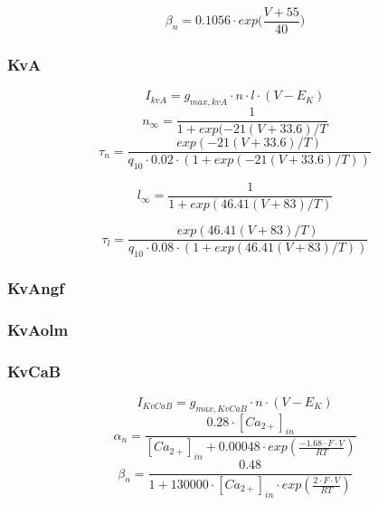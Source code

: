 \documentclass[12pt]{article}
\begin{document}
\begin{equation}
\beta_n = 0.1056 \cdot exp \Big( \frac{V + 55}{40} \Big)
\end{equation}

\subsubsection{KvA}
\begin{equation}
I_{kvA} = g_{max, kvA} \cdot n \cdot l \cdot (V - E_K)
\end{equation}
\begin{equation}
n_{\infty} = \frac{1}{1 + exp(-21(V + 33.6)/T}
\end{equation}
\begin{equation}
\tau_n = \frac{exp(-21(V + 33.6)/T) }
{q_{10} \cdot 0.02 \cdot (1 + exp(-21(V + 33.6)/T))}
\end{equation}

\begin{equation}
l_{\infty} = \frac{1}{1 + exp(46.41(V + 83)/T)}
\end{equation}

\begin{equation}
\tau_l = \frac{exp(46.41(V + 83)/T) }
{q_{10} \cdot 0.08 \cdot (1 + exp(46.41(V + 83)/T))}
\end{equation}

\subsubsection{KvAngf}



\subsubsection{KvAolm}


\subsubsection{KvCaB}
\begin{equation}
I_{KvCaB} = g_{max, KvCaB} \cdot n \cdot (V - E_K)
\end{equation}
\begin{equation}
\alpha_n = \frac{0.28 \cdot [Ca_{2+}]_{in} }{ [Ca_{2+}]_{in} + 0.00048 \cdot exp(\frac{-1.68 \cdot F \cdot V}{RT})  } 
\end{equation}
\begin{equation}
\beta_n = \frac{0.48}{1 + 130000 \cdot [Ca_{2+}]_{in} \cdot exp(\frac{2 \cdot F \cdot V}{RT})}
\end{equation}
\end{document}
